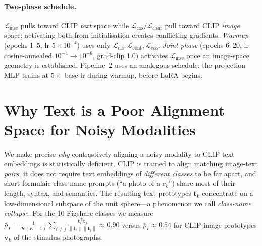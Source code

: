 \documentclass{article}
\begin{document}
\paragraph{Two-phase schedule.}\label{sec:training}$\mathcal{L}_\mathrm{mse}$ pulls toward CLIP \emph{text} space while $\mathcal{L}_\mathrm{cos}/\mathcal{L}_\mathrm{cont}$ pull toward CLIP \emph{image} space; activating both from initialisation creates conflicting gradients. \emph{Warmup} (epochs 1--5, lr $5{\times}10^{-4}$) uses only $\mathcal{L}_\mathrm{cls},\mathcal{L}_\mathrm{cont},\mathcal{L}_\mathrm{cos}$. \emph{Joint phase} (epochs 6--20, lr cosine-annealed $10^{-4}{\to}10^{-6}$, grad-clip 1.0) activates $\mathcal{L}_\mathrm{mse}$ once an image-space geometry is established. Pipeline~2 uses an analogous schedule: the projection MLP trains at $5{\times}$ base lr during warmup, before LoRA begins.

\section{Why Text is a Poor Alignment Space for Noisy Modalities}
\label{sec:theory}

We make precise \emph{why} contrastively aligning a noisy modality to CLIP text embeddings is statistically deficient. CLIP is trained to align matching image-text \emph{pairs}; it does not require text embeddings of \emph{different classes} to be far apart, and short formulaic class-name prompts (``a photo of a $c_k$'') share most of their length, syntax, and semantics. The resulting text prototypes $\mathbf{t}_k$ concentrate on a low-dimensional subspace of the unit sphere---a phenomenon we call \emph{class-name collapse}. For the 10 Figshare classes we measure
$\bar{\rho}_T = \tfrac{1}{K(K-1)}\sum_{i\neq j}\frac{\mathbf{t}_i^\top \mathbf{t}_j}{\|\mathbf{t}_i\|\|\mathbf{t}_j\|}\approx 0.90$
versus $\bar{\rho}_I \approx 0.54$ for CLIP image prototypes $\mathbf{v}_k$ of the stimulus photographs.
\end{document}
